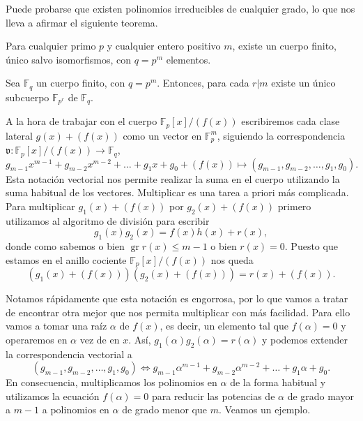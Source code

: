 Puede probarse que existen polinomios irreducibles de cualquier grado, lo que nos lleva a afirmar el siguiente teorema.

\begin{theorem}
  Para cualquier primo \(p\) y cualquier entero positivo \(m\), existe un cuerpo finito, único salvo isomorfismos, con \(q = p^m\) elementos.
\end{theorem}

\begin{proposition}
  \label{prop:subcuerpo-divisor-m}
  Sea \(\mathbb F_{q}\) un cuerpo finito, con \(q = p^m\).
  Entonces, para cada \(r | m\) existe un único subcuerpo \(\mathbb F_{p^r}\) de \(\mathbb F_q\).
\end{proposition}

A la hora de trabajar con el cuerpo \(\mathbb F_p[x]/(f(x))\) escribiremos cada clase lateral \(g(x) + (f(x))\) como un vector en \(\mathbb F_p^m\), siguiendo la correspondencia \(\mathfrak v : \mathbb F_p[x]/(f(x)) \to \mathbb F_q\),
\[
  g_{m-1}x^{m-1} + g_{m-2}x^{m-2}+ \dots + g_1x + g_0 + (f(x)) \mapsto (g_{m-1},g_{m-2}, \dots, g_1, g_0).
\]
Esta notación vectorial nos permite realizar la suma en el cuerpo utilizando la suma habitual de los vectores.
Multiplicar es una tarea a priori más complicada.
Para multiplicar \(g_1(x) + (f(x))\) por \(g_2(x) + (f(x))\) primero utilizamos al algoritmo de división para escribir
\[
  g_1(x)g_2(x) = f(x)h(x) + r(x),
\]
donde como sabemos o bien \(\operatorname{gr} r(x) \leq m -1\) o bien \(r(x) = 0\).
Puesto que estamos en el anillo cociente \(\mathbb F_p[x]/(f(x))\) nos queda
\[
  (g_1(x) + (f(x)))(g_2(x) + (f(x))) = r(x) + (f(x)).
\]

Notamos rápidamente que esta notación es engorrosa, por lo que vamos a tratar de encontrar otra mejor que nos permita multiplicar con más facilidad.
Para ello vamos a tomar una raíz \(\alpha\) de \(f(x)\), es decir, un elemento tal que \(f(\alpha) = 0\) y operaremos en \(\alpha\) vez de en \(x\).
Así, \(g_1(\alpha)g_2(\alpha) = r(\alpha)\) y podemos extender la correspondencia vectorial a
\[
  (g_{m-1}, g_{m-2}, \dots, g_1, g_0) \iff g_{m-1}\alpha^{m-1} + g_{m-2}\alpha^{m-2}+ \dots + g_1\alpha + g_0.
\]
En consecuencia, multiplicamos los polinomios en \(\alpha\) de la forma habitual y utilizamos la ecuación \(f(\alpha) = 0\) para reducir las potencias de \(\alpha\) de grado mayor a \(m-1\) a polinomios en \(\alpha\) de grado menor que \(m\).
Veamos un ejemplo.

